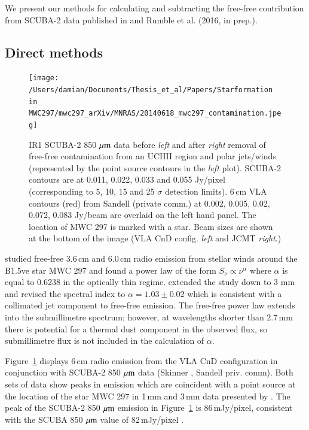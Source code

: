 We present our methods for calculating and subtracting the free-free contribution from SCUBA-2 data published in  \cite{Rumble:2015vn} and Rumble et al. (2016, in prep.). 

\subsection{Direct methods}

\begin{figure}
\begin{center}
\texttt{[image: /Users/damian/Documents/Thesis\_et\_al/Papers/Starformation in MWC297/mwc297\_arXiv/MNRAS/20140618\_mwc297\_contamination.jpeg]}
\caption{IR1 SCUBA-2 850\,$\,\mu\rm{m}$ data before \emph{left} and after \emph{right} removal of free-free contamination from an UCH\textrm{II} region and polar jets/winds (represented by the point source contours in the \emph{left} plot). SCUBA-2 contours are at 0.011, 0.022, 0.033 and 0.055 Jy/pixel (corresponding to 5, 10, 15 and 25 $\sigma$ detection limits). 6\,cm VLA contours (red) from Sandell (private comm.) at 0.002, 0.005, 0.02, 0.072, 0.083 Jy/beam are overlaid on the left hand panel. The location of MWC 297 is marked with a star. Beam sizes are shown at the bottom of the image (VLA CnD config. \emph{left} and JCMT \emph{right}.) }
\label{fig:contamination}
\end{center}
\end{figure}


\cite{Skinner:1993bh} studied free-free 3.6\,cm and 6.0\,cm radio emission from stellar winds around the B1.5ve star MWC 297 and found a power law of the form $S_{\nu} \propto \nu^{\alpha}$ where $\alpha$ is equal to 0.6238 in the optically thin regime. \cite{Sandell:2011dz} extended the study down to 3 mm and revised the spectral index to $\alpha = 1.03\pm0.02$ which is consistent with a collimated jet component to free-free emission. The free-free power law extends into the submillimetre spectrum; however, at wavelengths shorter than 2.7\,mm there is potential for a thermal dust component in the observed flux, so submillimetre flux is not included in the calculation of $\alpha$.

Figure~\ref{fig:contamination} displays 6\,cm radio emission from the VLA CnD configuration in conjunction with 
SCUBA-2 850\,$\,\mu\rm{m}$ data (Skinner \citeyear{Skinner:1993bh}, Sandell priv. comm). Both sets of data show 
peaks in emission which are coincident with a point source at the location of the star MWC 297 in 1\,mm and 
3\,mm data presented by \cite{Alonso-Albi:2009ve}. The peak of the SCUBA-2 850\,$\,\mu\rm{m}$ emission in 
Figure~\ref{fig:contamination} is 86\,mJy/pixel, consistent with the SCUBA 850\,$\,\mu\rm{m}$ value of 82\,mJy/pixel 
\citep{Alonso-Albi:2009ve}.

